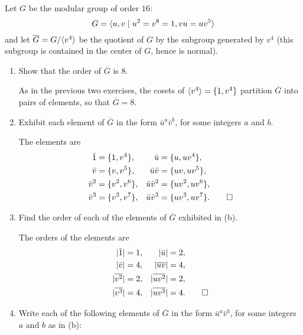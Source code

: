  Let $G$ be the modular group of order $16$:
\begin{equation*}
  G = \langle{u,v \mid u^2 = v^8 = 1, vu = uv^5}\rangle
\end{equation*}
and let $\overline{G} = G/\langle{v^4}\rangle$ be the quotient of $G$ by the
subgroup generated by $v^4$ (this subgroup is contained in the center
of $G$, hence is normal).
\begin{enumerate}
\item Show that the order of $\overline{G}$ is $8$.
  \begin{solution}
    As in the previous two exercises, the cosets of
    $\langle{v^4}\rangle = \{1, v^4\}$ partition $\overline{G}$ into pairs of
    elements, so that $\overline{G} = 8$.
  \end{solution}
\item Exhibit each element of $\overline{G}$ in the form
  $\bar{u}^a\bar{v}^b$, for some integers $a$ and $b$.
  \begin{solution}
    The elements are
    \begin{align*}
      \bar1 &= \{1, v^4\}, & \bar{u} &= \{u, uv^4\}, \\
      \bar{v} &= \{v, v^5\}, & \bar{u}\bar{v} &= \{uv, uv^5\}, \\
      \bar{v}^2 &= \{v^2, v^6\}, & \bar{u}\bar{v}^2 &= \{uv^2, uv^6\}, \\
      \bar{v}^3 &= \{v^3, v^7\}, & \bar{u}\bar{v}^3 &= \{uv^3, uv^7\}.
                                                      \qedhere
    \end{align*}
  \end{solution}
\item Find the order of each of the elements of $\overline{G}$
  exhibited in (b).
  \begin{solution}
    The orders of the elements are
    \begin{align*}
      \lvert{\bar1}\rvert &= 1,
      & \lvert{\bar{u}}\rvert &= 2, \\
      \lvert{\bar{v}}\rvert &= 4,
      & \lvert{\overline{uv}}\rvert &= 4, \\
      \lvert{\overline{v^2}}\rvert &= 2,
      & \lvert{\overline{uv^2}}\rvert &= 2, \\
      \lvert{\overline{v^3}}\rvert &= 4,
      & \lvert{\overline{uv^3}}\rvert &= 4. \qedhere
    \end{align*}
  \end{solution}
\item Write each of the following elements of $\overline{G}$ in the
  form $\bar{u}^a\bar{v}^b$, for some integers $a$ and $b$ as in (b):

\end{enumerate}
